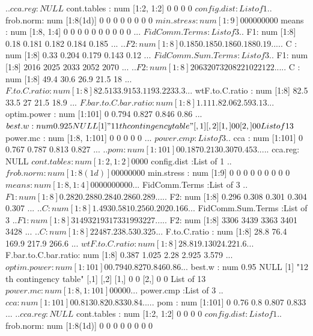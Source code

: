 \documentclass[11pt]{article} %
\begin{document}
\begin{Schunk}
\begin{Soutput}
  ..$ cca.reg: NULL
 $ cont.tables         : num [1:2, 1:2] 0 0 0 0
 $ config.dist         :List of 1
  ..$ frob.norm: num [1:8(1d)] 0 0 0 0 0 0 0 0
 $ min.stress          : num [1:9] 0 0 0 0 0 0 0 0 0
 $ means               : num [1:8, 1:4] 0 0 0 0 0 0 0 0 0 0 ...
 $ FidComm.Terms       :List of 3
  ..$ F1: num [1:8] 0.18 0.181 0.182 0.184 0.185 ...
  ..$ F2: num [1:8] 0.185 0.185 0.186 0.188 0.19 ...
  ..$ C : num [1:8] 0.33 0.204 0.179 0.143 0.12 ...
 $ FidComm.Sum.Terms   :List of 3
  ..$ F1: num [1:8] 2016 2025 2033 2052 2070 ...
  ..$ F2: num [1:8] 2063 2073 2082 2102 2122 ...
  ..$ C : num [1:8] 49.4 30.6 26.9 21.5 18 ...
 $ F.to.C.ratio        : num [1:8] 82.5 133.9 153.1 193.2 233.3 ...
 $ wtF.to.C.ratio      : num [1:8] 82.5 33.5 27 21.5 18.9 ...
 $ F.bar.to.C.bar.ratio: num [1:8] 1.11 1.8 2.06 2.59 3.13 ...
 $ optim.power         : num [1:101] 0 0.794 0.827 0.846 0.86 ...
 $ best.w              : num 0.925
NULL
[1] "11 th contingency table"
     [,1] [,2]
[1,]    0    0
[2,]    0    0
List of 13
 $ power.mc            : num [1:8, 1:101] 0 0 0 0 0 ...
 $ power.cmp           :List of 3
  ..$ cca    : num [1:101] 0 0.767 0.787 0.813 0.827 ...
  ..$ pom    : num [1:101] 0 0.187 0.213 0.307 0.453 ...
  ..$ cca.reg: NULL
 $ cont.tables         : num [1:2, 1:2] 0 0 0 0
 $ config.dist         :List of 1
  ..$ frob.norm: num [1:8(1d)] 0 0 0 0 0 0 0 0
 $ min.stress          : num [1:9] 0 0 0 0 0 0 0 0 0
 $ means               : num [1:8, 1:4] 0 0 0 0 0 0 0 0 0 0 ...
 $ FidComm.Terms       :List of 3
  ..$ F1: num [1:8] 0.282 0.288 0.284 0.286 0.289 ...
  ..$ F2: num [1:8] 0.296 0.308 0.301 0.304 0.307 ...
  ..$ C : num [1:8] 1.493 0.581 0.256 0.202 0.166 ...
 $ FidComm.Sum.Terms   :List of 3
  ..$ F1: num [1:8] 3149 3219 3173 3199 3227 ...
  ..$ F2: num [1:8] 3306 3439 3363 3401 3428 ...
  ..$ C : num [1:8] 224 87.2 38.5 30.3 25 ...
 $ F.to.C.ratio        : num [1:8] 28.8 76.4 169.9 217.9 266.6 ...
 $ wtF.to.C.ratio      : num [1:8] 28.8 19.1 30 24.2 21.6 ...
 $ F.bar.to.C.bar.ratio: num [1:8] 0.387 1.025 2.28 2.925 3.579 ...
 $ optim.power         : num [1:101] 0 0.794 0.827 0.846 0.86 ...
 $ best.w              : num 0.95
NULL
[1] "12 th contingency table"
     [,1] [,2]
[1,]    0    0
[2,]    0    0
List of 13
 $ power.mc            : num [1:8, 1:101] 0 0 0 0 0 ...
 $ power.cmp           :List of 3
  ..$ cca    : num [1:101] 0 0.813 0.82 0.833 0.84 ...
  ..$ pom    : num [1:101] 0 0.76 0.8 0.807 0.833 ...
  ..$ cca.reg: NULL
 $ cont.tables         : num [1:2, 1:2] 0 0 0 0
 $ config.dist         :List of 1
  ..$ frob.norm: num [1:8(1d)] 0 0 0 0 0 0 0 0

\end{Soutput}
\end{Schunk}
\end{document}
